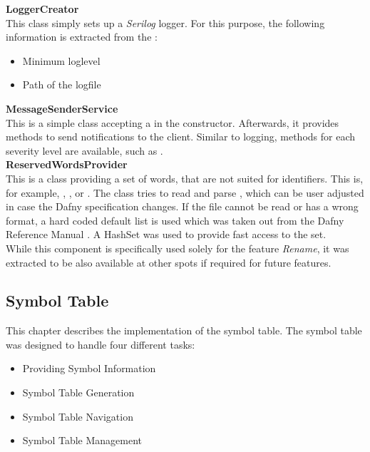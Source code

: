 \textbf{LoggerCreator}\\
This class simply sets up a \textit{Serilog} \cite{serilog} logger.
For this purpose, the following information is extracted from the :
\begin{itemize}
    \item Minimum loglevel
    \item Path of the logfile
\end{itemize}

\textbf{MessageSenderService}\\
This is a simple class accepting a  in the constructor.
Afterwards, it provides methods to send notifications to the client.
Similar to logging, methods for each severity level are available, such as .\\

\textbf{ReservedWordsProvider}\\
This is a class providing a set of words, that are not suited for identifiers.
This is, for example, , , or .
The class tries to read and parse , which can be user adjusted in case the Dafny specification changes.
If the file cannot be read or has a wrong format, a hard coded default list is used which was taken out from the Dafny Reference Manual \cite{dafnyReferenceManual}.
A HashSet was used to provide fast access to the set.\\

While this component is specifically used solely for the feature \textit{Rename},
it was extracted to be also available at other spots if required for future features.


\subsection{Symbol Table}
This chapter describes the implementation of the symbol table.
The symbol table was designed to handle four different tasks:

\begin{itemize}
    \item Providing Symbol Information
    \item Symbol Table Generation
    \item Symbol Table Navigation
    \item Symbol Table Management
\end{itemize}

